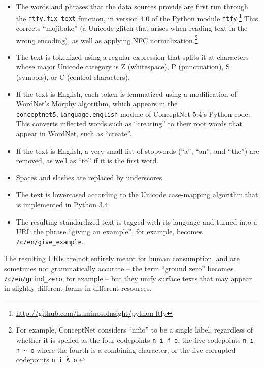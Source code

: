 \documentclass[letterpaper]{article}
\begin{document}
\begin{itemize}
\item The words and phrases that the data sources provide are first run
    through the {\tt ftfy.fix\_text} function, in version 4.0 of the Python
    module {\tt ftfy}.\footnote{
        \url{http://github.com/LuminosoInsight/python-ftfy}
    } This corrects ``mojibake'' (a Unicode glitch that arises when reading
    text in the wrong encoding), as well as applying NFC normalization.\footnote{
        For example, ConceptNet considers ``ni\~{n}o'' to be a single
        label, regardless of whether it is spelled as the four codepoints
        {\tt n i \~{n} o}, the five codepoints {\tt n i n \textasciitilde{} o}
        where the fourth is a combining character,
        or the five corrupted codepoints {\tt n i \~{A} \textpm{} o}.
    }
\item The text is tokenized using a regular expression that splits it at
    characters whose major Unicode category is Z (whitespace), P (punctuation),
    S (symbols), or C (control characters).
\item If the text is English, each token is lemmatized using a modification of
    WordNet's Morphy algorithm, which appears in the {\tt conceptnet5.language.english}
    module of ConceptNet 5.4's Python code. This converts inflected words such
    as ``creating'' to their root words that appear in WordNet, such as
    ``create''.
\item If the text is English, a very small list of stopwords (``a'', ``an'',
    and ``the'') are removed, as well as ``to'' if it is the first word.
\item Spaces and slashes are replaced by underscores.
\item The text is lowercased according to the Unicode case-mapping algorithm
    that is implemented in Python 3.4.
\item The resulting standardized text is tagged with its language and turned
    into a URI: the phrase ``giving an example'', for example, becomes
    {\tt /c/en/give\_example}.
\end{itemize}

The resulting URIs are not entirely meant for human consumption, and are
sometimes not grammatically accurate -- the term ``ground zero'' becomes
{\tt /c/en/grind\_zero}, for example -- but they unify surface texts that may
appear in slightly different forms in different resources.
\end{document}
